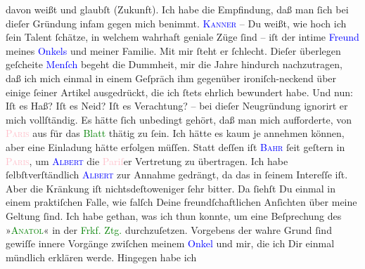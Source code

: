                davon weißt und glaubſt (Zukunft). Ich habe die Empfindung, daß man ſich bei dieſer
               Gründung infam gegen mich benimmt. \textsc{\textcolor{blue}{Kanner}{}\ledrightnote{\textcolor{blue}{Heinrich Kanner}}} – Du weißt, wie hoch ich ſein Talent ſchätze, in welchem {\pb}wahrhaft geniale Züge ſind – iſt der intime \textcolor{blue}{Freund}{} meines \textcolor{blue}{Onkels}{} und meiner Familie. Mit
               mir ſteht er ſchlecht. Dieſer überlegen geſcheite \textcolor{blue}{Menſch}{} begeht die Dummheit, mir die Jahre hindurch
               nachzutragen, daß ich mich einmal in einem Geſpräch  ihm gegenüber ironiſch-neckend über einige ſeiner Artikel ausgedrückt,
               die ich ſtets ehrlich bewundert habe. Und nun: Iſt es Haß? Iſt es Neid? Iſt es
               Verachtung? – bei dieſer Neugründung ignorirt er mich vollſtändig. Es hätte {\pb}ſich unbedingt gehört, daß man mich aufforderte, von
                  \textsc{\textcolor{pink}{Paris}{}\ledrightnote{\textcolor{pink}{Paris}}} aus für das \textcolor{green}{Blatt}{} thätig
               zu ſein. Ich hätte es kaum je annehmen können, aber eine Einladung hätte erfolgen
               müſſen. Statt deſſen iſt \textsc{\textcolor{blue}{Bahr}{}\ledrightnote{\textcolor{blue}{Hermann Bahr}}} ſeit geſtern in \textsc{\textcolor{pink}{Paris}{}\ledrightnote{\textcolor{pink}{Paris}}}, um \textsc{\textcolor{blue}{Albert}{}\ledrightnote{\textcolor{blue}{Henri Albert}}} die \textcolor{pink}{Pariſ}{}\ledrightnote{\textcolor{pink}{Paris}}er Vertretung zu übertragen. Ich
               habe ſelbſtverſtändlich \textsc{\textcolor{blue}{Albert}{}\ledrightnote{\textcolor{blue}{Henri Albert}}} zur Annahme gedrängt, da das in ſeinem Intereſſe iſt. Aber die Kränkung iſt
               nichtsdeſtoweniger ſehr bitter. Da ſiehſt Du einmal in einem praktiſchen Falle, wie
               falſch Deine freundſchaftlichen Anſichten über meine Geltung ſind.\pend
           \pstart
           {\pb}Ich habe gethan, was ich thun konnte, um eine
               Beſprechung des »\textsc{\textcolor{green}{Anatol}{}\ledrightnote{\textcolor{green}{Anatol}}}« in der \textcolor{green}{Frkf. Ztg.}{}\ledrightnote{\textcolor{green}{Frankfurter Zeitung}} durchzuſetzen.
               Vorgebens der wahre Grund ſind gewiſſe  innere
               Vorgänge zwiſchen meinem \textcolor{blue}{Onkel}{} und mir, die ich Dir einmal mündlich erklären werde. Hingegen habe ich
